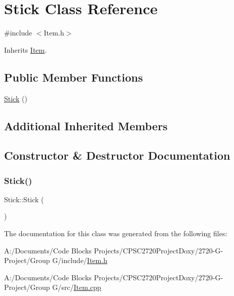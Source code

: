 \hypertarget{class_stick}{}\section{Stick Class Reference}
\label{class_stick}


{\ttfamily \#include $<$Item.\+h$>$}



Inherits \mbox{\hyperlink{class_item}{Item}}.

\subsection*{Public Member Functions}
\begin{DoxyCompactItemize}
\item 
\mbox{\hyperlink{class_stick_a52dabcec8665749c50dc8ddaf4347060}{Stick}} ()
\end{DoxyCompactItemize}
\subsection*{Additional Inherited Members}


\subsection{Constructor \& Destructor Documentation}
\mbox{\label{class_stick_a52dabcec8665749c50dc8ddaf4347060}} 
\subsubsection{\texorpdfstring{Stick()}{Stick()}}
{\footnotesize\ttfamily Stick\+::\+Stick (\begin{DoxyParamCaption}{ }\end{DoxyParamCaption})}



The documentation for this class was generated from the following files\+:\begin{DoxyCompactItemize}
\item 
A\+:/\+Documents/\+Code Blocks Projects/\+C\+P\+S\+C2720\+Project\+Doxy/2720-\/\+G-\/\+Project/\+Group G/include/\mbox{\hyperlink{_item_8h}{Item.\+h}}\item 
A\+:/\+Documents/\+Code Blocks Projects/\+C\+P\+S\+C2720\+Project\+Doxy/2720-\/\+G-\/\+Project/\+Group G/src/\mbox{\hyperlink{_item_8cpp}{Item.\+cpp}}\end{DoxyCompactItemize}
